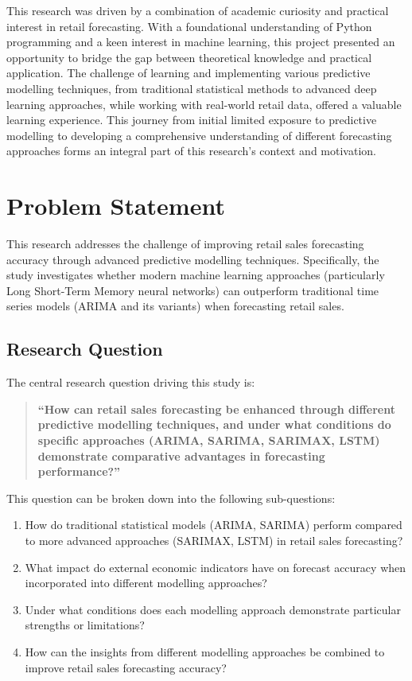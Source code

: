 \documentclass[12pt,a4paper]{report}
\begin{document}
This research was driven by a combination of academic curiosity and practical interest in retail forecasting. With a foundational understanding of Python programming and a keen interest in machine learning, this project presented an opportunity to bridge the gap between theoretical knowledge and practical application. The challenge of learning and implementing various predictive modelling techniques, from traditional statistical methods to advanced deep learning approaches, while working with real-world retail data, offered a valuable learning experience. This journey from initial limited exposure to predictive modelling to developing a comprehensive understanding of different forecasting approaches forms an integral part of this research's context and motivation.

\section{Problem Statement}

This research addresses the challenge of improving retail sales forecasting accuracy through advanced predictive modelling techniques. Specifically, the study investigates whether modern machine learning approaches (particularly Long Short-Term Memory neural networks) can outperform traditional time series models (ARIMA and its variants) when forecasting retail sales.

\subsection{Research Question}
The central research question driving this study is:

\begin{quote}
\textbf{``How can retail sales forecasting be enhanced through different predictive modelling techniques, and under what conditions do specific approaches (ARIMA, SARIMA, SARIMAX, LSTM) demonstrate comparative advantages in forecasting performance?''}
\end{quote}

This question can be broken down into the following sub-questions:
\begin{enumerate}
    \item How do traditional statistical models (ARIMA, SARIMA) perform compared to more advanced approaches (SARIMAX, LSTM) in retail sales forecasting?
    \item What impact do external economic indicators have on forecast accuracy when incorporated into different modelling approaches?
    \item Under what conditions does each modelling approach demonstrate particular strengths or limitations?
    \item How can the insights from different modelling approaches be combined to improve retail sales forecasting accuracy?
\end{enumerate}
\end{document}

